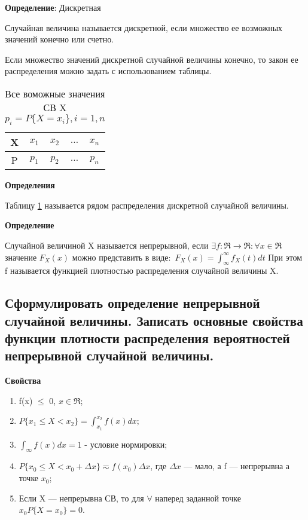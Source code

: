 \textbf{Определение}: Дискретная

Случайная величина называется дискретной, если множество ее возможных значений конечно или счетно.

Если множество значений дискретной случайной величины конечно, то закон ее распределения можно задать с использованием таблицы.
\begin{table}[ht!]
	\begin{center}
		\caption{Все воможные значения СВ X $p_i = P\{X=x_i\}, i = 1,n$}
		\label{tbl:best}
		\begin{tabular}{|c|c|c|c|c|}
			\hline
			X & $x_1$ & $x_2$ & $\dots$ & $x_n$ \\ 
			\hline
			P & $p_1$ & $p_2$ & $\dots$ & $p_n$ \\
			\hline
		\end{tabular}
	\end{center}
\end{table}

\textbf{Определения}

Таблицу \ref{tbl:best} называется рядом распределения дискретной случайной величины.

\textbf{Определение}

Случайной величиной X называется непрерывной, если $\exists f: \Re \rightarrow \Re: \forall x \in \Re$ значение $F_X(x)$ можно представить в виде:\
$F_X(x) = \int_{\infty}^{\infty} f_X(t)dt$ При этом f называется функцией плотностью распределения случайной величины X.

\subsection{Сформулировать определение непрерывной случайной величины. Записать основные свойства функции плотности распределения вероятностей непрерывной случайной величины.}

\textbf{Свойства}

\begin{enumerate}[label=\arabic*.]
	\item f(x) $\leq$ 0, $x \in \Re$;
	\item $P\{x_1 \leq X < x_2\} = \int_{x_1}^{x_2}f(x)dx$;
	\item $\int_{\infty}f(x)dx = 1$ - условие нормировки;
	\item $P\{x_0 \leq X < x_0 + \Delta x\} \eqsim f(x_0)\Delta x$, где $\Delta x$ --- мало, а f --- непрерывна а точке $x_0$;
	\item Если X --- непрерывна СВ, то для $\forall$ наперед заданной точке $x_0 P\{X=x_0\}=0$.
\end{enumerate}


